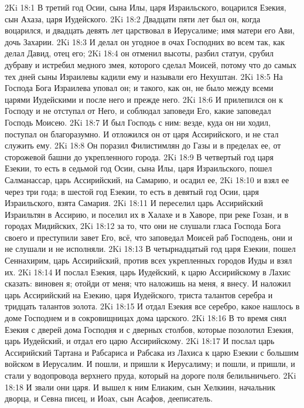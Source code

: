 \vs 2Ki 18:1 В третий год Осии, сына Илы, царя Израильского, воцарился Езекия, сын Ахаза, царя Иудейского.
\vs 2Ki 18:2 Двадцати пяти лет был он, когда воцарился, и двадцать девять лет царствовал в Иерусалиме; имя матери его Ави, дочь Захарии.
\vs 2Ki 18:3 И делал он угодное в очах Господних во всем так, как делал Давид, отец его;
\vs 2Ki 18:4 он отменил высоты, разбил статуи, срубил дубраву и истребил медного змея, которого сделал Моисей, потому что до самых тех дней сыны Израилевы кадили ему и называли его Нехуштан.
\vs 2Ki 18:5 На Господа Бога Израилева уповал он; и такого, как он, не было между всеми царями Иудейскими и после него и прежде него.
\vs 2Ki 18:6 И прилепился он к Господу и не отступал от Него, и соблюдал заповеди Его, какие заповедал Господь Моисею.
\vs 2Ki 18:7 И был Господь с ним: везде, куда он ни ходил, поступал он благоразумно. И отложился он от царя Ассирийского, и не стал служить ему.
\vs 2Ki 18:8 Он поразил Филистимлян до Газы и в пределах ее, от сторожевой башни до укрепленного города.
\rsbpar\vs 2Ki 18:9 В четвертый год царя Езекии, то есть в седьмой год Осии, сына Илы, царя Израильского, пошел Салманассар, царь Ассирийский, на Самарию, и осадил ее,
\vs 2Ki 18:10 и взял ее через три года; в шестой год Езекии, то есть в девятый год Осии, царя Израильского, взята Самария.
\vs 2Ki 18:11 И переселил царь Ассирийский Израильтян в Ассирию, и поселил их в Халахе и в Хаворе, при реке Гозан, и в городах Мидийских,
\vs 2Ki 18:12 за то, что они не слушали гласа Господа Бога своего и преступили завет Его, всё, что заповедал Моисей раб Господень, они и не слушали и не исполняли.
\rsbpar\vs 2Ki 18:13 В четырнадцатый год царя Езекии, пошел Сеннахирим, царь Ассирийский, против всех укрепленных городов Иуды и взял их.
\vs 2Ki 18:14 И послал Езекия, царь Иудейский, к царю Ассирийскому в Лахис сказать: виновен я; отойди от меня; что наложишь на меня, я внесу. И наложил царь Ассирийский на Езекию, царя Иудейского, триста талантов серебра и тридцать талантов золота.
\vs 2Ki 18:15 И отдал Езекия все серебро, какое нашлось в доме Господнем и в сокровищницах дома царского.
\vs 2Ki 18:16 В то время снял Езекия  с дверей дома Господня и с дверных столбов, которые позолотил Езекия, царь Иудейский, и отдал его царю Ассирийскому.
\rsbpar\vs 2Ki 18:17 И послал царь Ассирийский Тартана и Рабсариса и Рабсака из Лахиса к царю Езекии с большим войском в Иерусалим. И пошли, и пришли к Иерусалиму; и пошли, и пришли, и стали у водопровода верхнего пруда, который на дороге поля белильничьего.
\vs 2Ki 18:18 И звали они царя. И вышел к ним Елиаким, сын Хелкиин, начальник дворца, и Севна писец, и Иоах, сын Асафов, дееписатель.
